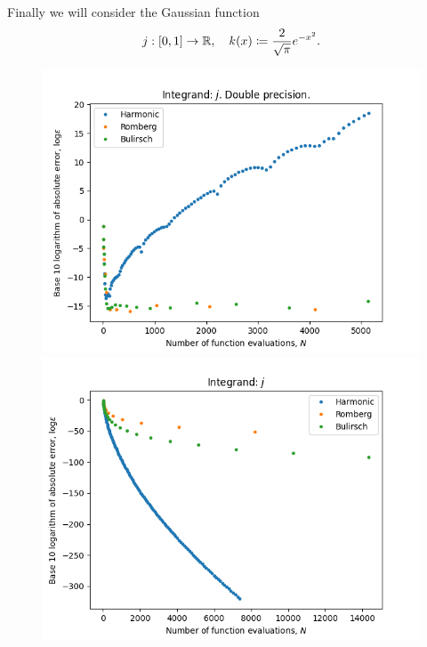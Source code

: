 Finally we will consider the Gaussian function
\[
j: [0,1]\rightarrow \mathbb{R}, \quad k(x) \coloneqq \frac{2}{\sqrt{\pi}} e^{-x^2}.
\]
\begin{figure}[H]
\centering
\begin{minipage}{0.45\textwidth}
\centering
\includegraphics[scale=0.45]{../results/romberg_plots/gaussian.png}
\end{minipage}
\begin{minipage}{0.45\textwidth}
\centering
\includegraphics[scale=0.45]{../results/romberg_plots/gaussian_hp.png}
\end{minipage}
\end{figure}

